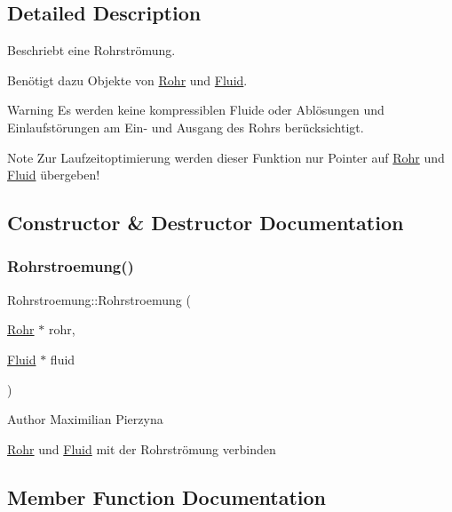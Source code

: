 \subsection{Detailed Description}
Beschriebt eine Rohrströmung. 

Benötigt dazu Objekte von \hyperlink{class_rohr}{Rohr} und \hyperlink{class_fluid}{Fluid}.

\begin{DoxyWarning}{Warning}
Es werden keine kompressiblen Fluide oder Ablösungen und Einlaufstörungen am Ein-\/ und Ausgang des Rohrs berücksichtigt.
\end{DoxyWarning}
\begin{DoxyNote}{Note}
Zur Laufzeitoptimierung werden dieser Funktion nur Pointer auf \hyperlink{class_rohr}{Rohr} und \hyperlink{class_fluid}{Fluid} übergeben! 
\end{DoxyNote}


\subsection{Constructor \& Destructor Documentation}
\mbox{\label{class_rohrstroemung_aa8ee146566f18b2a4ca4cbfc1946c2b8}} 
\subsubsection{\texorpdfstring{Rohrstroemung()}{Rohrstroemung()}}
{\footnotesize\ttfamily Rohrstroemung\+::\+Rohrstroemung (\begin{DoxyParamCaption}\item[{\hyperlink{class_rohr}{Rohr} $\ast$}]{rohr,  }\item[{\hyperlink{class_fluid}{Fluid} $\ast$}]{fluid }\end{DoxyParamCaption})}

\begin{DoxyAuthor}{Author}
Maximilian Pierzyna 
\end{DoxyAuthor}
\hyperlink{class_rohr}{Rohr} und \hyperlink{class_fluid}{Fluid} mit der Rohrströmung verbinden 

\subsection{Member Function Documentation}
\mbox{\label{class_rohrstroemung_ac4d2f31e451f1a3c97627d3a87df419d}} 

